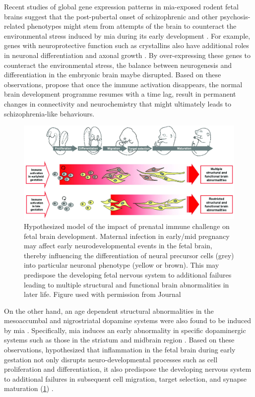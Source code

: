 \documentclass[12pt]{scrbook}
\newcommand*{\scz}{schizophrenia}
\begin{document}
Recent studies of global gene expression patterns in \gls{mia}-exposed rodent fetal brains \citep{Oskvig2012,Garbett2012a} suggest that the post-pubertal onset of schizophrenic and other psychosis-related phenotypes might stem from attempts of the brain to counteract the environmental stress induced by \gls{mia} during its early development \citep{Garbett2012a}.
For example, genes with neuroprotective function such as crystallins also have additional roles in neuronal differentiation and axonal growth \citep{Garbett2012a}. 
By over-expressing these genes to counteract the environmental stress, the balance between neurogenesis and differentiation in the embryonic brain maybe disrupted. 
Based on these observations, \citet{Garbett2012a} propose that once the immune activation disappears, the normal brain development programme resumes with a time lag, result in permanent changes in connectivity and neurochemistry that might ultimately leads to \scz-like behaviours.

\begin{figure}
	\centering
	\includegraphics[width=\textwidth]{figure/mia_impact.jpg}
	\caption[Hypothesized model of the impact of prenatal immune challenge on fetal brain development]{Hypothesized model of the impact of prenatal immune challenge on fetal brain development.
		Maternal infection in early/mid pregnancy may affect early neurodevelopmental events in the fetal brain, thereby influencing the differentiation of neural precursor cells (grey) into particular neuronal phenotype (yellow or brown).
		This may predispose the developing fetal nervous system to additional failures leading to multiple structural and functional brain abnormalities in later life.
		Figure used with permission from Journal \citep{Meyer2007a}}
	\label{fig:miaEffect}
\end{figure}

On the other hand, an age dependent structural abnormalities in the mesoaccumbal and nigrostriatal dopamine systems were also found to be induced by \gls{mia} \citep{Vuillermot2010}.
Specifically, \gls{mia} induces an early abnormality in specific dopaminergic systems such as those in the striatum and midbrain region \citep{Vuillermot2010}.
Based on these observations, \citet{Meyer2007a} hypothesized that inflammation in the fetal brain during early gestation not only disrupts neuro-developmental processes such as cell proliferation and differentiation, it also predispose the developing nervous system to additional failures in subsequent cell migration, target selection, and synapse maturation (\cref{fig:miaEffect}) \citep{Meyer2007a}.
	
\end{document}
